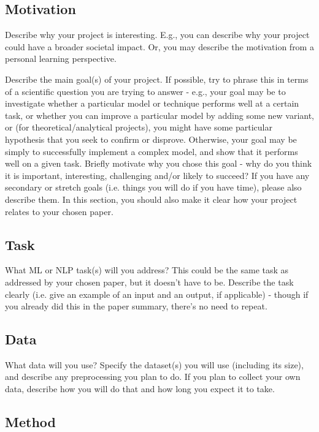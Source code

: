 \documentclass[10pt,twocolumn,letterpaper]{article}
\begin{document}
\subsection{Motivation}

Describe why your project is interesting. E.g., you can describe why your project could have a broader societal impact. Or, you may describe the motivation from a personal learning perspective.

Describe the main goal(s) of your project. If possible, try to phrase this in terms of a scientific question you are trying to answer - e.g., your goal may be to investigate whether a particular model or technique performs well at a certain task, or whether you can improve a particular model by adding some new variant, or (for theoretical/analytical projects), you might have some particular hypothesis that you seek to confirm or disprove. Otherwise, your goal may be simply to successfully implement a complex model, and show that it performs well on a given task. Briefly motivate why you chose this goal - why do you think it is important, interesting, challenging and/or likely to succeed? If you have any secondary or stretch goals (i.e. things you will do if you have time), please also describe them. In this section, you should also make it clear how your project relates to your chosen paper.


\subsection{Task}

What ML or NLP task(s) will you address? This could be the same task as addressed by your chosen paper, but it doesn't have to be. Describe the task clearly (i.e. give an example of an input and an output, if applicable) - though if you already did this in the paper summary, there's no need to repeat.

\subsection{Data}

What data will you use? Specify the dataset(s) you will use (including its size), and describe any preprocessing you plan to do. If you plan to collect your own data, describe how you will do that and how long you expect it to take.

\subsection{Method}
\end{document}
